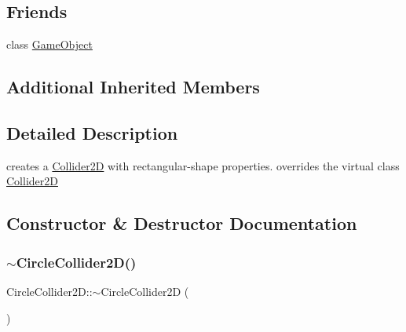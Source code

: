 \subsection*{Friends}
\begin{DoxyCompactItemize}
\item 
class \hyperlink{class_mason_1_1_circle_collider2_d_a00df87c957d8f7ee0fc51f07a0542f4a}{Game\+Object}
\end{DoxyCompactItemize}
\subsection*{Additional Inherited Members}


\subsection{Detailed Description}
creates a \hyperlink{class_mason_1_1_collider2_d}{Collider2D} with rectangular-\/shape properties. overrides the virtual class \hyperlink{class_mason_1_1_collider2_d}{Collider2D} 

\subsection{Constructor \& Destructor Documentation}
\hypertarget{class_mason_1_1_circle_collider2_d_a18a73d32bc87cd999d17c5f080afae13}{}\label{class_mason_1_1_circle_collider2_d_a18a73d32bc87cd999d17c5f080afae13} 
\subsubsection{\texorpdfstring{$\sim$\+Circle\+Collider2\+D()}{~CircleCollider2D()}}
{\footnotesize\ttfamily Circle\+Collider2\+D\+::$\sim$\+Circle\+Collider2D (\begin{DoxyParamCaption}{ }\end{DoxyParamCaption})}

\hypertarget{class_mason_1_1_circle_collider2_d_a58075e2786326b5136240a1dde186dee}{}\label{class_mason_1_1_circle_collider2_d_a58075e2786326b5136240a1dde186dee} 
